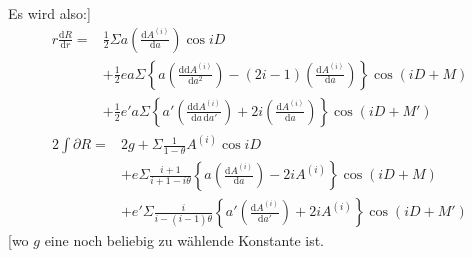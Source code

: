 Es wird also:]
\[
\begin{aligned}
r\frac{\mathrm{d}R}{\mathrm{d}r}={}&\tfrac12\Sigma a\left(\frac{\mathrm{d}A^{(i)}}{\mathrm{d}a}\right)\cos iD\\
&+\tfrac12 ea\Sigma\left\{a\left(\frac{\mathrm{d}\mathrm{d}A^{(i)}}{\mathrm{d}a^2}\right)-(2i-1)\left(\frac{\mathrm{d}A^{(i)}}{\mathrm{d}a}\right)\right\}\cos(iD+M)\\
&+\tfrac12 e'a\Sigma\left\{a'\left(\frac{\mathrm{d}\mathrm{d}A^{(i)}}{\mathrm{d}a\,\mathrm{d}a'}\right)+2i\left(\frac{\mathrm{d}A^{(i)}}{\mathrm{d}a}\right)\right\}\cos(iD+M')
\end{aligned}
\]
\noindent[und wegen \(\mathrm{d}r=-ae\sin M\mathord{.}\,n\mathrm{d}t\), \(\mathrm{d}V=(1-2e\cos M)n\mathrm{d}t\):
\[
\begin{aligned}
\frac{\partial R}{n\mathrm{d}t}={}&-\tfrac12\Sigma iA^{(i)}\sin iD\\
&-\tfrac12 e\Sigma(i+1)\left\{a\left(\frac{\mathrm{d}A^{(i)}}{\mathrm{d}a}\right)-2iA^{(i)}\right\}\sin(iD+M)\\
&-\tfrac12 e'\Sigma i\left\{a'\left(\frac{\mathrm{d}A^{(i)}}{\mathrm{d}a'}\right)+2iA^{(i)}\right\}\sin(iD+M')
\end{aligned}
\]
\Needspace{5\baselineskip}
\noindent und hieraus, wenn man
\[\theta=\frac{n'}{n}\]
\noindent setzt:]
\[
\begin{aligned}
2\int\partial R={}&2g+\Sigma\frac{1}{1-\theta}A^{(i)}\cos iD\\
&+e\Sigma\frac{i+1}{i+1-i\theta}\left\{a\left(\frac{\mathrm{d}A^{(i)}}{\mathrm{d}a}\right)-2iA^{(i)}\right\}\cos(iD+M)\\
&+e'\Sigma\frac{i}{i-(i-1)\theta}\left\{a'\left(\frac{\mathrm{d}A^{(i)}}{\mathrm{d}a'}\right)+2iA^{(i)}\right\}\cos(iD+M')
\end{aligned}
\]
\noindent[wo \(g\) eine noch beliebig zu wählende Konstante ist.

